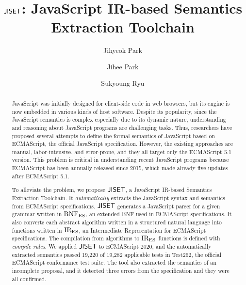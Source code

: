 \documentclass[sigconf,review,anonymous=true]{acmart}
\begin{document}
\title{\( \text{\sf JISET} \): JavaScript IR-based Semantics Extraction Toolchain}

\author{Jihyeok Park}

\author{Jihee Park}

\author{Sukyoung Ryu}

\begin{abstract}
JavaScript was initially designed for client-side code in web browsers,
but its engine is now embedded in various kinds of host software.
Despite its popularity, since the JavaScript semantics is complex
especially due to its dynamic nature, understanding and reasoning
about JavaScript programs are challenging tasks.  Thus,
researchers have proposed several attempts to define the formal semantics
of JavaScript based on ECMAScript, the official JavaScript specification.
However, the existing approaches are manual, labor-intensive, and
error-prone, and they all target only the ECMAScript 5.1 version.
This problem is critical in understanding recent JavaScript programs
because ECMAScript has been annually released since 2015, which made
already five updates after ECMAScript 5.1.

To alleviate the problem, we propose \( \text{\sf JISET} \), a JavaScript IR-based Semantics
Extraction Toolchain.  It \textit{automatically} extracts the JavaScript syntax and
semantics from ECMAScript specifications.  \( \text{\sf JISET} \) generates a JavaScript
parser for a given grammar written in \( \text{BNF}_{\text{ES}} \), an extended BNF
used in ECMAScript specifications.  It also converts each
abstract algorithm written in a structured natural language into
functions written in \( \text{IR}_\text{ES} \), an Intermediate Representation
for ECMAScript specifications.  The compilation from algorithms to
\( \text{IR}_\text{ES} \) functions is defined with \textit{compile rules}.
We applied \( \text{\sf JISET} \) to ECMAScript 2020,
and the automatically extracted semantics passed 19,220 of 19,282
applicable tests in Test262, the official ECMAScript conformance test
suite.  The tool also extracted the semantics of an incomplete proposal,
and it detected three errors from the specification and they were all
confirmed.
\end{abstract}


\maketitle










\normalem


\end{document}
